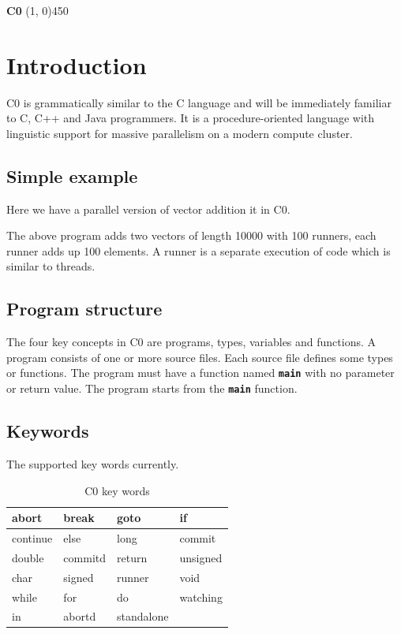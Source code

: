 \documentclass[a4paper]{article}
\begin{document}
\begin{flushleft}
{\Large \textbf{C0}
\line(1, 0){450}}
\end{flushleft}

{\section{Introduction}}

C0 is grammatically similar to the C language and will be immediately familiar to C, C++ and Java programmers. It is a procedure-oriented language with linguistic support for massive parallelism on a modern compute cluster.

{\subsection{Simple example}}

Here we have a parallel version of vector addition it in C0.

{\color{blue}{}}

The above program adds two vectors of length 10000 with 100 runners, each runner adds up 100 elements. A runner is a separate execution of code which is similar to threads.

{\subsection{Program structure}}

The four key concepts in C0 are programs, types, variables and functions. A program consists of one or more source files. Each source file defines some types or functions. The program must have a function named \textbf{\texttt{main}} with no parameter or return value. The program starts from the \textbf{\texttt{main}} function.

{\subsection{Keywords}}

\begin{table}[htbp]
\centering
\caption{C0 key words}
\begin{tablenotes}
\small
\centering
\item The supported key words currently.
\end{tablenotes}
\begin{tabular}{|l|l|l|l|}
\hline
abort & break & goto & if\\
\hline
continue & else & long & commit \\
\hline
double & commitd & return & unsigned\\
\hline
char & signed & runner & void\\
\hline
while & for & do & watching\\
\hline
in & abortd & standalone & \\
\hline
\end{tabular}
\label{table:key-words}
\end{table}
\end{document}
